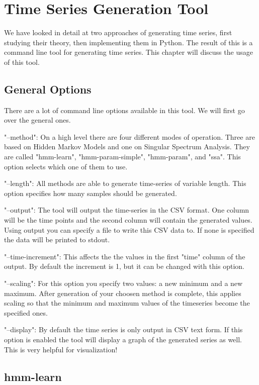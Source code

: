 \chapter{Time Series Generation Tool}\label{chapter:tool}

We have looked in detail at two approaches of generating time series, first studying their theory, then implementing them in Python. The result of this is a command line tool for generating time series. This chapter will discuss the usage of this tool. 

\section{General Options}

There are a lot of command line options available in this tool. We will first go over the general ones. 

"--method": On a high level there are four different modes of operation. Three are based on Hidden Markov Models and one on Singular Spectrum Analysis. They are called "hmm-learn", "hmm-param-simple", "hmm-param", and "ssa". This option selects which one of them to use. 

"--length": All methods are able to generate time-series of variable length. This option specifies how many samples should be generated. 

"--output": The tool will output the time-series in the CSV format. One column will be the time points and the second column will contain the generated values. Using output you can specify a file to write this CSV data to. If none is specified the data will be printed to stdout. 

"--time-increment": This affects the the values in the first "time" column of the output. By default the increment is 1, but it can be changed with this option. 

"--scaling": For this option you specify two values: a new minimum and a new maximum. After generation of your choosen method is complete, this applies scaling so that the minimum and maximum values of the timeseries become the specified ones. 

"--display": By default the time series is only output in CSV text form. If this option is enabled the tool will display a graph of the generated series as well. This is very helpful for visualization!

\section{hmm-learn}

